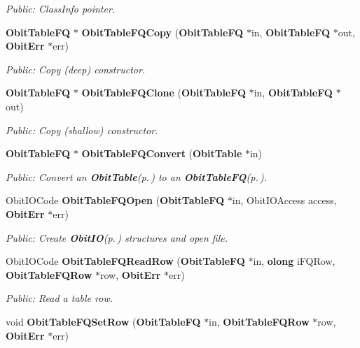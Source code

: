 \begin{CompactItemize}
\begin{CompactList}\small\item\em Public: Class\-Info pointer. \item\end{CompactList}\item 
{\bf Obit\-Table\-FQ} $\ast$ {\bf Obit\-Table\-FQCopy} ({\bf Obit\-Table\-FQ} $\ast$in, {\bf Obit\-Table\-FQ} $\ast$out, {\bf Obit\-Err} $\ast$err)
\begin{CompactList}\small\item\em Public: Copy (deep) constructor. \item\end{CompactList}\item 
{\bf Obit\-Table\-FQ} $\ast$ {\bf Obit\-Table\-FQClone} ({\bf Obit\-Table\-FQ} $\ast$in, {\bf Obit\-Table\-FQ} $\ast$out)
\begin{CompactList}\small\item\em Public: Copy (shallow) constructor. \item\end{CompactList}\item 
{\bf Obit\-Table\-FQ} $\ast$ {\bf Obit\-Table\-FQConvert} ({\bf Obit\-Table} $\ast$in)
\begin{CompactList}\small\item\em Public: Convert an {\bf Obit\-Table}{\rm (p.\,\pageref{structObitTable})} to an {\bf Obit\-Table\-FQ}{\rm (p.\,\pageref{structObitTableFQ})}. \item\end{CompactList}\item 
Obit\-IOCode {\bf Obit\-Table\-FQOpen} ({\bf Obit\-Table\-FQ} $\ast$in, Obit\-IOAccess access, {\bf Obit\-Err} $\ast$err)
\begin{CompactList}\small\item\em Public: Create {\bf Obit\-IO}{\rm (p.\,\pageref{structObitIO})} structures and open file. \item\end{CompactList}\item 
Obit\-IOCode {\bf Obit\-Table\-FQRead\-Row} ({\bf Obit\-Table\-FQ} $\ast$in, {\bf olong} i\-FQRow, {\bf Obit\-Table\-FQRow} $\ast$row, {\bf Obit\-Err} $\ast$err)
\begin{CompactList}\small\item\em Public: Read a table row. \item\end{CompactList}\item 
void {\bf Obit\-Table\-FQSet\-Row} ({\bf Obit\-Table\-FQ} $\ast$in, {\bf Obit\-Table\-FQRow} $\ast$row, {\bf Obit\-Err} $\ast$err)

\end{CompactItemize}
